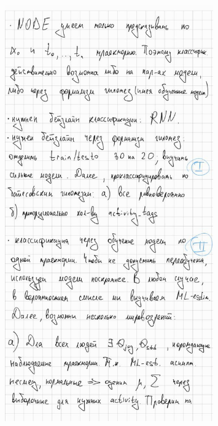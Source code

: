 \documentclass[referee, pdflatex, sn-mathphys-num]{sn-jnl}
\theoremstyle{definition}
\theoremstyle{plain}
\begin{document}
	\begin{figure}[h]
		\centering
		\includegraphics[width=0.8\textwidth]{imgs/photo_3_2024-12-13_23-46-45}
	\end{figure}
	
\end{document}
